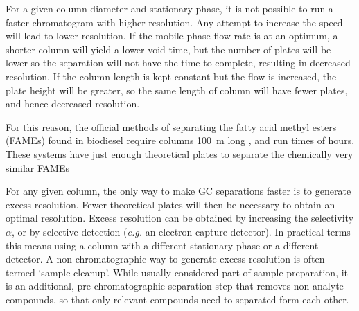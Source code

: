 For a given column diameter and stationary phase, it is not possible to run a
faster chromatogram with higher resolution. Any attempt to increase the speed
will lead to lower resolution. If the mobile phase flow rate is at an optimum, a
shorter column will yield a lower void time, but the number of plates will be
lower so the separation will not have the time to complete, resulting in
decreased resolution. If the column length is kept constant but the flow is
increased, the plate height will be greater, so the same length of column will
have fewer plates, and hence decreased resolution.

For this reason, the official methods of separating the fatty acid methyl esters
(FAMEs) found in biodiesel require columns \SI{100}{\metre} long
\autocite{AOCS2017}, and run times of hours. These systems have just enough
theoretical plates to separate the chemically very similar FAMEs

For any given column, the only way to make GC separations faster is to generate
excess resolution. Fewer theoretical plates will then be necessary to obtain an
optimal resolution. Excess resolution can be obtained by increasing the
selectivity $\alpha$, or by selective detection (\textit{e.g.} an electron
capture detector). In practical terms this means using a column with a different
stationary phase or a different detector. A non-chromatographic way to generate
excess resolution is often termed `sample cleanup'. While usually considered
part of sample preparation, it is an additional, pre-chromatographic separation
step that removes non-analyte compounds, so that only relevant compounds need to
separated form each other.


